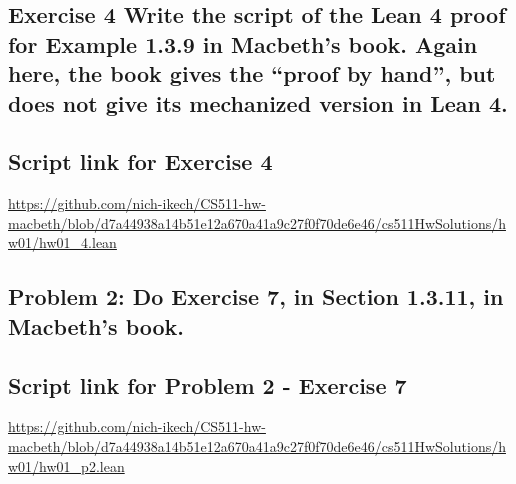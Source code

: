 \documentclass{article}
\begin{document}
\newpage
\subsection*{Exercise 4 Write the script of the Lean 4 proof for Example 1.3.9 in Macbeth’s book. Again
here, the book gives the “proof by hand”, but does not give its mechanized version in Lean 4.}
\subsection*{Script link for Exercise 4}
\url{https://github.com/nich-ikech/CS511-hw-macbeth/blob/d7a44938a14b51e12a670a41a9c27f0f70de6e46/cs511HwSolutions/hw01/hw01_4.lean}

\newpage
\subsection*{Problem 2: Do Exercise 7, in Section 1.3.11, in Macbeth’s book.}
\subsection*{Script link for Problem 2 - Exercise 7}
\url{https://github.com/nich-ikech/CS511-hw-macbeth/blob/d7a44938a14b51e12a670a41a9c27f0f70de6e46/cs511HwSolutions/hw01/hw01_p2.lean}
\end{document}
